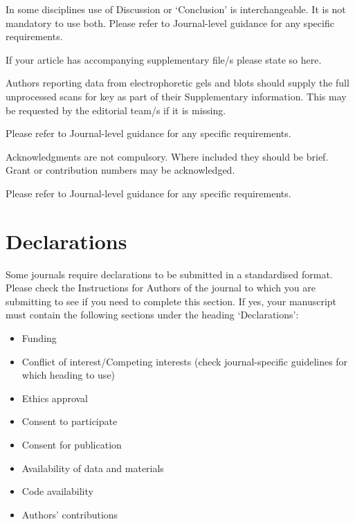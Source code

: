 \documentclass[sn-basic,pdflatex]{sn-jnl}
\theoremstyle{remark}
\theoremstyle{definition}
\providecommand{\tightlist}{%
  \setlength{\itemsep}{0pt}\setlength{\parskip}{0pt}}
\begin{document}
In some disciplines use of Discussion or `Conclusion' is
interchangeable. It is not mandatory to use both. Please refer to
Journal-level guidance for any specific requirements.

\backmatter


If your article has accompanying supplementary file/s please state so
here.

Authors reporting data from electrophoretic gels and blots should supply
the full unprocessed scans for key as part of their Supplementary
information. This may be requested by the editorial team/s if it is
missing.

Please refer to Journal-level guidance for any specific requirements.


Acknowledgments are not compulsory. Where included they should be brief.
Grant or contribution numbers may be acknowledged.

Please refer to Journal-level guidance for any specific requirements.

\hypertarget{declarations}{%
\section*{Declarations}\label{declarations}}

Some journals require declarations to be submitted in a standardised
format. Please check the Instructions for Authors of the journal to
which you are submitting to see if you need to complete this section. If
yes, your manuscript must contain the following sections under the
heading `Declarations':

\begin{itemize}
\tightlist
\item
  Funding
\item
  Conflict of interest/Competing interests (check journal-specific
  guidelines for which heading to use)
\item
  Ethics approval
\item
  Consent to participate
\item
  Consent for publication
\item
  Availability of data and materials
\item
  Code availability
\item
  Authors' contributions
\end{itemize}
\end{document}
